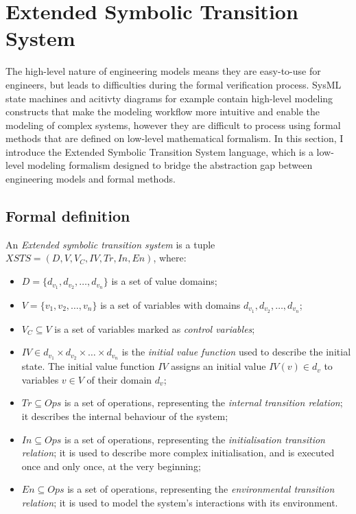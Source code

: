 \section{Extended Symbolic Transition System}\label{sec:xsts}

The high-level nature of engineering models means they are easy-to-use for engineers, but leads to difficulties during the formal verification process. SysML state machines and acitivty diagrams for example contain high-level modeling constructs that make the modeling workflow more intuitive and enable the modeling of complex systems, however they are difficult to process using formal methods that are defined on low-level mathematical formalism. In this section, I introduce the Extended Symbolic Transition System \cite{xsts} language, which is a low-level modeling formalism designed to bridge the abstraction gap between engineering models and formal methods.

\subsection{Formal definition}

\begin{definition}
	
	An \emph{Extended symbolic transition system} is a tuple \( \mathit{XSTS} = (D, V, V_C, \mathit{IV}, \mathit{Tr}, \mathit{In}, \mathit{En}) \), where:
	
	\begin{itemize}
		\item \(D = \{ d_{v_1}, d_{v_2}, \dots, d_{v_n} \} \) is a set of value domains;
		\item \(V = \{ v_1, v_2, \dots, v_n \} \) is a set of variables with domains \(d_{v_1}, d_{v_2}, \dots, d_{v_n}\);
		\item \(V_C \subseteq V\) is a set of variables marked as \emph{control variables};
		\item \(\mathit{IV} \in d_{v_1} \times d_{v_2} \times \dots \times d_{v_n}\) is the \emph{initial value function} used to describe the initial state. The initial value function \(\mathit{IV}\) assigns an initial value \(\mathit{IV}(v) \in d_v\) to variables \(v \in V\) of their domain \(d_v\);
		\item \(\mathit{Tr} \subseteq \mathit{Ops}\) is a set of operations, representing the \emph{internal transition relation}; it describes the internal behaviour of the system;
		\item \(\mathit{In} \subseteq \mathit{Ops}\) is a set of operations, representing the \emph{initialisation transition relation}; it is used to describe more complex initialisation, and is executed once and only once, at the very beginning;
		\item \(\mathit{En} \subseteq \mathit{Ops}\) is a set of operations, representing the \emph{environmental transition relation}; it is used to model the system's interactions with its environment.
	\end{itemize}
\end{definition}\label{def:xsts}

